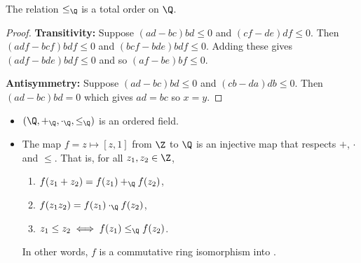 \begin{proposition}
    The relation $\le_\Q$ is a total order on $\Q$.
\end{proposition}
\begin{proof}
    \textbf{Transitivity:} Suppose $(ad - bc) bd \le 0$ and $(cf - de) df \le
    0$.
    Then $(adf - bcf) bdf \le 0$ and $(bcf - bde) bdf \le 0$.
    Adding these gives $(adf - bde) bdf \le 0$ and so $(af - be) bf \le 0$.

    \textbf{Antisymmetry:} Suppose $(ad - bc) bd \le 0$ and $(cb - da) db \le 0$.
    Then $(ad - bc) bd = 0$ which gives $ad = bc$ so $x = y$.
\end{proof}
\begin{theorem} \leavevmode
    \begin{itemize}
        \item $(\Q, +_\Q, \cdot_\Q, \le_\Q)$ is an ordered field.
        \item The map $f = z \mapsto [z, 1]$ from $\Z$ to $\Q$ is an
        injective map that respects $+$, $\cdot$ and $\le$.
        That is, for all $z_1, z_2 \in \Z$,
        \begin{enumerate}
            \item $f(z_1 + z_2) = f(z_1) +_\Q f(z_2)$,
            \item $f(z_1 z_2) = f(z_1) \cdot_\Q f(z_2)$,
            \item $z_1 \le z_2 \iff f(z_1) \le_\Q f(z_2)$.
        \end{enumerate}
        In other words, $f$ is a commutative ring isomorphism into \Q.
    \end{itemize}
\end{theorem}
